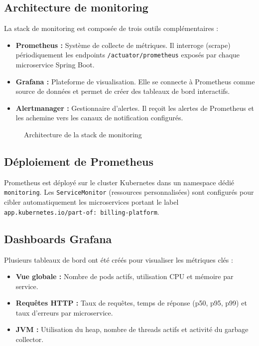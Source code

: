 \subsection{Architecture de monitoring}
La stack de monitoring est composée de trois outils complémentaires :
\begin{itemize}
    \item \textbf{Prometheus :} Système de collecte de métriques. Il interroge (scrape) périodiquement les endpoints \texttt{/actuator/prometheus} exposés par chaque microservice Spring Boot.
    \item \textbf{Grafana :} Plateforme de visualisation. Elle se connecte à Prometheus comme source de données et permet de créer des tableaux de bord interactifs.
    \item \textbf{Alertmanager :} Gestionnaire d'alertes. Il reçoit les alertes de Prometheus et les achemine vers les canaux de notification configurés.
\end{itemize}

\begin{figure}[H]
    \centering
    \caption{Architecture de la stack de monitoring}
    \label{fig:monitoring_architecture}
\end{figure}

\subsection{Déploiement de Prometheus}
Prometheus est déployé sur le cluster Kubernetes dans un namespace dédié \texttt{monitoring}. Les \texttt{ServiceMonitor} (ressources personnalisées) sont configurés pour cibler automatiquement les microservices portant le label \texttt{app.kubernetes.io/part-of: billing-platform}.

\subsection{Dashboards Grafana}
Plusieurs tableaux de bord ont été créés pour visualiser les métriques clés :
\begin{itemize}
    \item \textbf{Vue globale :} Nombre de pods actifs, utilisation CPU et mémoire par service.
    \item \textbf{Requêtes HTTP :} Taux de requêtes, temps de réponse (p50, p95, p99) et taux d'erreurs par microservice.
    \item \textbf{JVM :} Utilisation du heap, nombre de threads actifs et activité du garbage collector.
\end{itemize}

